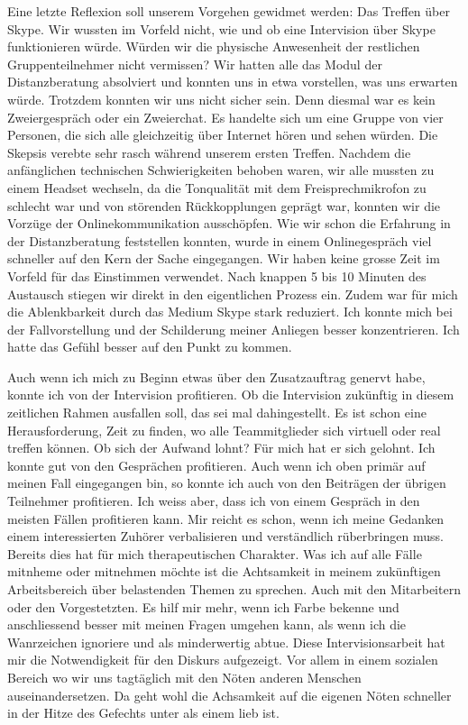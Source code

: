 Eine letzte Reflexion soll unserem Vorgehen gewidmet werden: Das Treffen über Skype. Wir wussten im Vorfeld nicht, wie und ob eine Intervision über Skype funktionieren würde. Würden wir die physische Anwesenheit der restlichen Gruppenteilnehmer nicht vermissen? Wir hatten alle das Modul der Distanzberatung absolviert und konnten uns in etwa vorstellen, was uns erwarten würde. Trotzdem konnten wir uns nicht sicher sein. Denn diesmal war es kein Zweiergespräch oder ein Zweierchat. Es handelte sich um eine Gruppe von vier Personen, die sich alle gleichzeitig über Internet hören und sehen würden. Die Skepsis verebte sehr rasch während unserem ersten Treffen. Nachdem die anfänglichen technischen Schwierigkeiten behoben waren, wir alle mussten zu einem Headset wechseln, da die Tonqualität mit dem Freisprechmikrofon zu schlecht war und von störenden Rückkopplungen geprägt war, konnten wir die Vorzüge der Onlinekommunikation ausschöpfen. Wie wir schon die Erfahrung in der Distanzberatung feststellen konnten, wurde in einem Onlinegespräch viel schneller auf den Kern der Sache eingegangen. Wir haben keine grosse Zeit im Vorfeld für das Einstimmen verwendet. Nach knappen 5 bis 10 Minuten des Austausch stiegen wir direkt in den eigentlichen Prozess ein. Zudem war für mich die Ablenkbarkeit durch das Medium Skype stark reduziert. Ich konnte mich bei der Fallvorstellung und der Schilderung meiner Anliegen besser konzentrieren. Ich hatte das Gefühl besser auf den Punkt zu kommen. 

Auch wenn ich mich zu Beginn etwas über den Zusatzauftrag genervt habe, konnte ich von der Intervision profitieren. Ob die Intervision zukünftig in diesem zeitlichen Rahmen ausfallen soll, das sei mal dahingestellt. Es ist schon eine Herausforderung, Zeit zu finden, wo alle Teammitglieder sich virtuell oder real treffen können. Ob sich der Aufwand lohnt? Für mich hat er sich gelohnt. Ich konnte gut von den Gesprächen profitieren. Auch wenn ich oben primär auf meinen Fall eingegangen bin, so konnte ich auch von den Beiträgen der übrigen Teilnehmer profitieren. Ich weiss aber, dass ich von einem Gespräch in den meisten Fällen profitieren kann. Mir reicht es schon, wenn ich meine Gedanken einem interessierten Zuhörer verbalisieren und verständlich rüberbringen muss. Bereits dies hat für mich therapeutischen Charakter. Was ich auf alle Fälle mitnheme oder mitnehmen möchte ist die Achtsamkeit in meinem zukünftigen Arbeitsbereich über belastenden Themen zu sprechen. Auch mit den Mitarbeitern oder den Vorgestetzten. Es hilf mir mehr, wenn ich Farbe bekenne und anschliessend besser mit meinen Fragen umgehen kann, als wenn ich die Wanrzeichen ignoriere und als minderwertig abtue. Diese Intervisionsarbeit hat mir die Notwendigkeit für den Diskurs aufgezeigt. Vor allem in einem sozialen Bereich wo wir uns tagtäglich mit den Nöten anderen Menschen auseinandersetzen. Da geht wohl die Achsamkeit auf die eigenen Nöten schneller in der Hitze des Gefechts unter als einem lieb ist.
